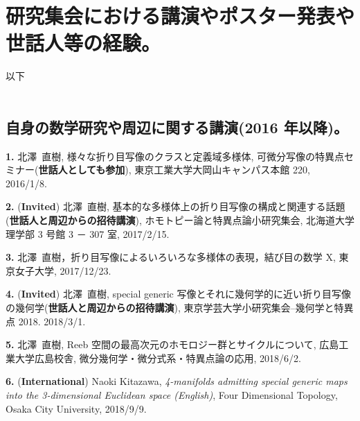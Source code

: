 \documentclass{article}
\begin{document}
\section{研究集会における講演やポスター発表や世話人等の経験。}
以下 \\
\\
\subsection{自身の数学研究や周辺に関する講演(2016 年以降)。}

%
%
%
\par\noindent
{\bf 1.} 北澤\ 直樹, 様々な折り目写像のクラスと定義域多様体, 可微分写像の特異点セミナー({\bf 世話人としても参加}), 東京工業大学大岡山キャンパス本館 220, 2016/1/8.

\par\noindent
{\bf 2.} ({\bf  Invited}) 北澤\ 直樹, 基本的な多様体上の折り目写像の構成と関連する話題({\bf 世話人と周辺からの招待講演}), ホモトピー論と特異点論小研究集会, 北海道大学理学部 3 号館 3 － 307 室, 2017/2/15.

\par\noindent
{\bf 3.} 北澤\ 直樹，折り目写像によるいろいろな多様体の表現，結び目の数学 X, 東京女子大学, 2017/12/23.

\par\noindent
{\bf 4.} ({\bf  Invited}) 北澤\ 直樹, special generic 写像とそれに幾何学的に近い折り目写像の幾何学({\bf 世話人と周辺からの招待講演}), 東京学芸大学小研究集会--幾何学と特異点 2018. 2018/3/1.

\par\noindent
{\bf 5.} 北澤\ 直樹, Reeb 空間の最高次元のホモロジー群とサイクルについて, 広島工業大学広島校舎, 微分幾何学・微分式系・特異点論の応用, 2018/6/2.

\par\noindent
{\bf 6.} ({\bf International}) Naoki Kitazawa, \textsl{4-manifolds admitting special generic maps into the 3-dimensional Euclidean space {\rm (}English{\rm )}}, Four Dimensional Topology, Osaka City University, 2018/9/9. 
\end{document}
